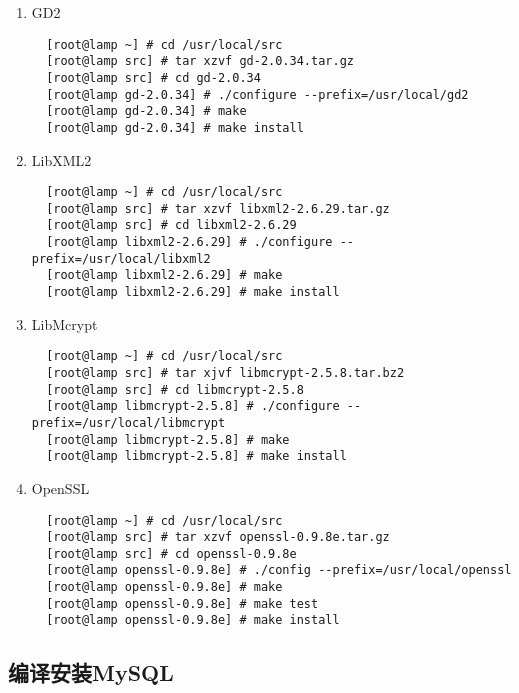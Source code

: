 \begin{enumerate}[itemsep=0pt,parsep=0pt]
\item GD2
  \small{
\begin{verbatim}
  [root@lamp ~] # cd /usr/local/src
  [root@lamp src] # tar xzvf gd-2.0.34.tar.gz
  [root@lamp src] # cd gd-2.0.34
  [root@lamp gd-2.0.34] # ./configure --prefix=/usr/local/gd2
  [root@lamp gd-2.0.34] # make
  [root@lamp gd-2.0.34] # make install  
\end{verbatim}
  }
  \normalsize

\item LibXML2
  \small{
\begin{verbatim}
  [root@lamp ~] # cd /usr/local/src
  [root@lamp src] # tar xzvf libxml2-2.6.29.tar.gz
  [root@lamp src] # cd libxml2-2.6.29
  [root@lamp libxml2-2.6.29] # ./configure --prefix=/usr/local/libxml2
  [root@lamp libxml2-2.6.29] # make
  [root@lamp libxml2-2.6.29] # make install
\end{verbatim}
  }
  \normalsize

\item LibMcrypt
  \small{
\begin{verbatim}
  [root@lamp ~] # cd /usr/local/src
  [root@lamp src] # tar xjvf libmcrypt-2.5.8.tar.bz2
  [root@lamp src] # cd libmcrypt-2.5.8
  [root@lamp libmcrypt-2.5.8] # ./configure --prefix=/usr/local/libmcrypt
  [root@lamp libmcrypt-2.5.8] # make
  [root@lamp libmcrypt-2.5.8] # make install
\end{verbatim}
  }
  \normalsize

\item OpenSSL
  \small{
\begin{verbatim}
  [root@lamp ~] # cd /usr/local/src
  [root@lamp src] # tar xzvf openssl-0.9.8e.tar.gz
  [root@lamp src] # cd openssl-0.9.8e
  [root@lamp openssl-0.9.8e] # ./config --prefix=/usr/local/openssl
  [root@lamp openssl-0.9.8e] # make
  [root@lamp openssl-0.9.8e] # make test
  [root@lamp openssl-0.9.8e] # make install
\end{verbatim}
  }
  \normalsize

\end{enumerate}

\subsection{编译安装MySQL}

